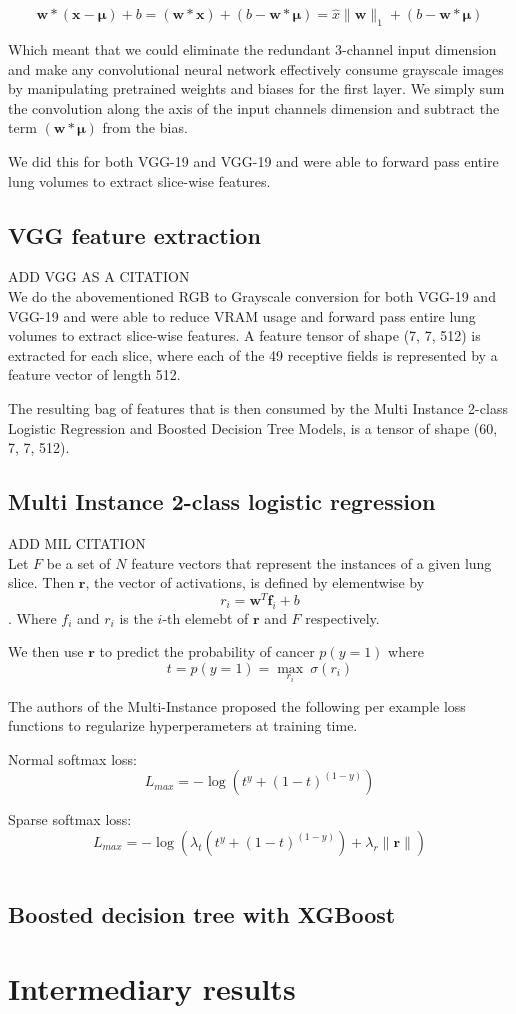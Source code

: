 \documentclass[twocolumn,10pt]{article}
\newcommand{\red}[1]{{\color{red}#1}}
\newcommand{\temp}[1]{{\red{#1}\\}}
\renewcommand{\b}{\boldsymbol}
\begin{document}
$$\b w \ast (\b x - \b \mu) + b = (\b w \ast \b x) + (b - \b w \ast \b \mu)
= \hat x \|\b w\|_1 + (b - \b w \ast \b \mu)$$

Which meant that we could eliminate the redundant 3-channel input dimension and
make any convolutional neural network effectively consume grayscale images by
 manipulating pretrained weights and biases for the first layer. We simply sum
 the convolution along the axis of the input channels dimension and subtract the
 term $(\b w \ast \b \mu)$ from the bias.

 We did this for both VGG-19 and VGG-19 and were able to forward pass entire
 lung volumes to extract slice-wise features.

\subsection{VGG feature extraction}
\temp{ADD VGG AS A CITATION}
We do the abovementioned RGB to Grayscale conversion for both VGG-19 and VGG-19 
and were able to reduce VRAM usage and forward pass entire lung volumes to 
extract slice-wise features. A feature tensor of shape (7, 7, 512) is extracted
for each slice, where each of the 49 receptive fields is represented by a feature
vector of length 512.

The resulting bag of features that is then consumed by the
Multi Instance 2-class Logistic Regression and Boosted Decision Tree Models,
is a tensor of shape (60, 7, 7, 512).

\subsection{Multi Instance 2-class logistic regression}
\temp{ADD MIL CITATION}
Let $F$ be a set of $N$ feature vectors that represent the instances of a given
lung slice. 
Then $\b r$, the vector of activations, is defined by elementwise by
$$r_i = \b w^T \b f_i + b$$.
Where $f_i$ and $r_i$ is the $i$-th elemebt of $\b r$ and $F$ respectively.

We then use $\b r $ to predict the probability of cancer $p(y = 1)$ where
$$t = p(y = 1) = \max_{r_i} \ \sigma(r_i)$$

The authors of the Multi-Instance proposed the following per example loss functions
to regularize hyperperameters at training time.

Normal softmax loss:
$$L_{max} = -\log(t^y + (1-t) ^{(1-y)})$$

Sparse softmax loss:
$$L_{max} = -\log(\lambda_t(t^y + (1-t) ^{(1-y)}) + \lambda_r\|\b r\|)$$

$$$$
\subsection {Boosted decision tree with XGBoost}

\section{Intermediary results}
\end{document}
